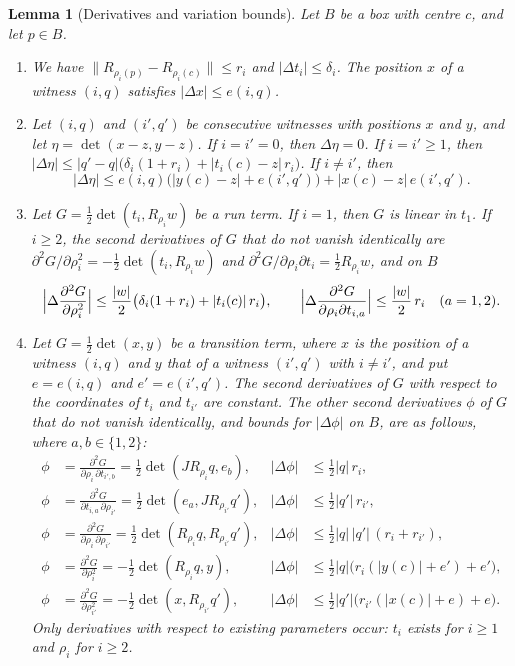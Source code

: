 \documentclass[11pt]{amsart}
\newtheorem{lemma}[theorem]{Lemma}
\theoremstyle{definition}
\theoremstyle{remark}
\numberwithin{equation}{section}
\begin{document}
\begin{lemma}[Derivatives and variation bounds]\label{lem:deriv}
Let $B$ be a box with centre $c$, and let $p\in B$.
\begin{enumerate}[label=\textup{(\alph*)},leftmargin=*]
\item We have $\|R_{\rho_i(p)}-R_{\rho_i(c)}\|\le r_i$ and $|\Delta t_i|\le\delta_i$. The position $x$ of a witness $(i,q)$ satisfies $|\Delta x|\le e(i,q)$.
\item Let $(i,q)$ and $(i',q')$ be consecutive witnesses with positions $x$ and $y$, and let $\eta=\det(x-z,y-z)$. If $i=i'=0$, then $\Delta\eta=0$. If $i=i'\ge1$, then $|\Delta\eta|\le|q'-q|\bigl(\delta_i(1+r_i)+|t_i(c)-z|\,r_i\bigr)$. If $i\ne i'$, then
\[
|\Delta\eta|\le e(i,q)\bigl(|y(c)-z|+e(i',q')\bigr)+|x(c)-z|\,e(i',q').
\]
\item Let $G=\frac12\det(t_i,R_{\rho_i}w)$ be a run term. If $i=1$, then $G$ is linear in $t_1$. If $i\ge2$, the second derivatives of $G$ that do not vanish identically are $\partial^2G/\partial\rho_i^2=-\frac12\det(t_i,R_{\rho_i}w)$ and $\partial^2G/\partial\rho_i\partial t_i=\frac12R_{\rho_i}w$, and on $B$
\[
\Bigl|\Delta\frac{\partial^2G}{\partial\rho_i^2}\Bigr|\le\frac{|w|}2\bigl(\delta_i(1+r_i)+|t_i(c)|\,r_i\bigr),\qquad\Bigl|\Delta\frac{\partial^2G}{\partial\rho_i\partial t_{i,a}}\Bigr|\le\frac{|w|}2\,r_i\quad(a=1,2).
\]
\item Let $G=\frac12\det(x,y)$ be a transition term, where $x$ is the position of a witness $(i,q)$ and $y$ that of a witness $(i',q')$ with $i\ne i'$, and put $e=e(i,q)$ and $e'=e(i',q')$. The second derivatives of $G$ with respect to the coordinates of $t_i$ and $t_{i'}$ are constant. The other second derivatives $\phi$ of $G$ that do not vanish identically, and bounds for $|\Delta\phi|$ on $B$, are as follows, where $a,b\in\{1,2\}$:
\begin{align*}
\phi&=\frac{\partial^2G}{\partial\rho_i\,\partial t_{i',b}}=\frac12\det(JR_{\rho_i}q,e_b),&|\Delta\phi|&\le\tfrac12|q|\,r_i,\\
\phi&=\frac{\partial^2G}{\partial t_{i,a}\,\partial\rho_{i'}}=\frac12\det(e_a,JR_{\rho_{i'}}q'),&|\Delta\phi|&\le\tfrac12|q'|\,r_{i'},\\
\phi&=\frac{\partial^2G}{\partial\rho_i\,\partial\rho_{i'}}=\frac12\det(R_{\rho_i}q,R_{\rho_{i'}}q'),&|\Delta\phi|&\le\tfrac12|q|\,|q'|\,(r_i+r_{i'}),\\
\phi&=\frac{\partial^2G}{\partial\rho_i^2}=-\frac12\det(R_{\rho_i}q,y),&|\Delta\phi|&\le\tfrac12|q|\bigl(r_i(|y(c)|+e')+e'\bigr),\\
\phi&=\frac{\partial^2G}{\partial\rho_{i'}^2}=-\frac12\det(x,R_{\rho_{i'}}q'),&|\Delta\phi|&\le\tfrac12|q'|\bigl(r_{i'}(|x(c)|+e)+e\bigr).
\end{align*}
Only derivatives with respect to existing parameters occur: $t_i$ exists for $i\ge1$ and $\rho_i$ for $i\ge2$.
\end{enumerate}
\end{lemma}
\end{document}
